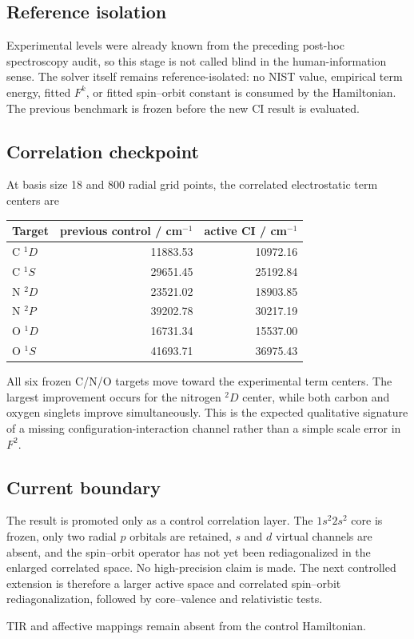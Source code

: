 \subsection{Reference isolation}
Experimental levels were already known from the preceding post-hoc spectroscopy audit, so this stage is not called blind in the human-information sense.  The solver itself remains reference-isolated: no NIST value, empirical term energy, fitted $F^k$, or fitted spin--orbit constant is consumed by the Hamiltonian.  The previous benchmark is frozen before the new CI result is evaluated.

\subsection{Correlation checkpoint}
At basis size 18 and 800 radial grid points, the correlated electrostatic term centers are
\begin{center}
\begin{tabular}{lrr}
\hline
Target & previous control / cm$^{-1}$ & active CI / cm$^{-1}$\\
\hline
C $^1D$ & 11883.53 & 10972.16\\
C $^1S$ & 29651.45 & 25192.84\\
N $^2D$ & 23521.02 & 18903.85\\
N $^2P$ & 39202.78 & 30217.19\\
O $^1D$ & 16731.34 & 15537.00\\
O $^1S$ & 41693.71 & 36975.43\\
\hline
\end{tabular}
\end{center}
All six frozen C/N/O targets move toward the experimental term centers.  The largest improvement occurs for the nitrogen $^2D$ center, while both carbon and oxygen singlets improve simultaneously.  This is the expected qualitative signature of a missing configuration-interaction channel rather than a simple scale error in $F^2$.

\subsection{Current boundary}
The result is promoted only as a control correlation layer.  The $1s^2 2s^2$ core is frozen, only two radial $p$ orbitals are retained, $s$ and $d$ virtual channels are absent, and the spin--orbit operator has not yet been rediagonalized in the enlarged correlated space.  No high-precision claim is made.  The next controlled extension is therefore a larger active space and correlated spin--orbit rediagonalization, followed by core--valence and relativistic tests.

TIR and affective mappings remain absent from the control Hamiltonian.
